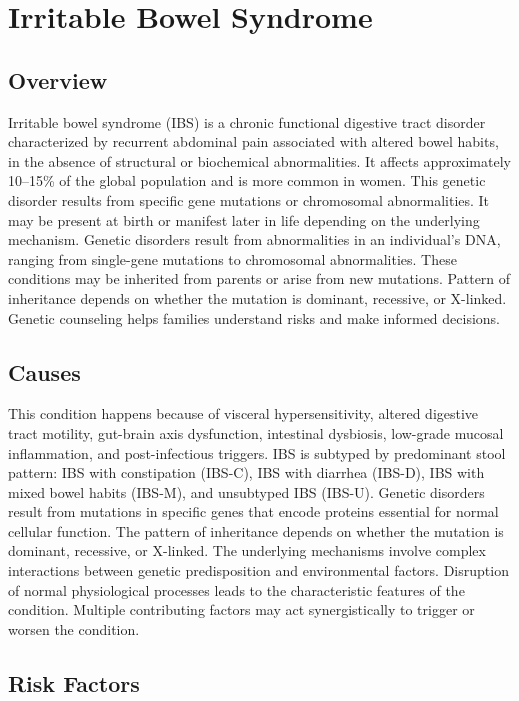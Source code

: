 \chapter{Irritable Bowel Syndrome}
\label{sec:Irritable Bowel Syndrome}

\section{Overview}
Irritable bowel syndrome (IBS) is a chronic functional digestive tract disorder characterized by recurrent abdominal pain associated with altered bowel habits, in the absence of structural or biochemical abnormalities. It affects approximately 10--15\% of the global population and is more common in women. This genetic disorder results from specific gene mutations or chromosomal abnormalities. It may be present at birth or manifest later in life depending on the underlying mechanism. Genetic disorders result from abnormalities in an individual's DNA, ranging from single-gene mutations to chromosomal abnormalities. These conditions may be inherited from parents or arise from new mutations. Pattern of inheritance depends on whether the mutation is dominant, recessive, or X-linked. Genetic counseling helps families understand risks and make informed decisions.
\section{Causes}
This condition happens because of visceral hypersensitivity, altered digestive tract motility, gut-brain axis dysfunction, intestinal dysbiosis, low-grade mucosal inflammation, and post-infectious triggers. IBS is subtyped by predominant stool pattern: IBS with constipation (IBS-C), IBS with diarrhea (IBS-D), IBS with mixed bowel habits (IBS-M), and unsubtyped IBS (IBS-U). Genetic disorders result from mutations in specific genes that encode proteins essential for normal cellular function. The pattern of inheritance depends on whether the mutation is dominant, recessive, or X-linked. The underlying mechanisms involve complex interactions between genetic predisposition and environmental factors. Disruption of normal physiological processes leads to the characteristic features of the condition. Multiple contributing factors may act synergistically to trigger or worsen the condition.
\section{Risk Factors}


